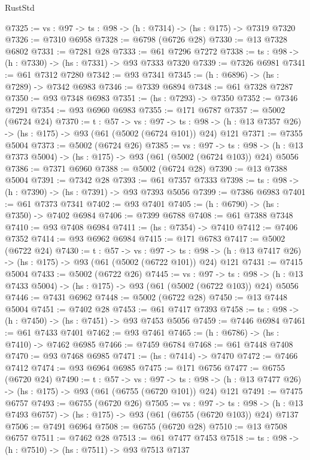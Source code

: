 \begin{lexlean}{RustStd}
\begin{coremodule}
@7325 := {vs : @97} -> {ts : @98} -> (h : @7314) -> (hs : @175) -> @7319 @7320
@7326 := @7310 @6958
@7328 := @6798 (@6726 @28)
@7330 := @13 @7328 @6802
@7331 := @7281 @28
@7333 := @61 @7296 @7272
@7338 := {ts : @98} -> (h : @7330) -> (hs : @7331) -> @93 @7333 @7320
@7339 := @7326 @6981
@7341 := @61 @7312 @7280
@7342 := @93 @7341
@7345 := (h : @6896) -> (hs : @7289) -> @7342 @6983
@7346 := @7339 @6894
@7348 := @61 @7328 @7287
@7350 := @93 @7348 @6983
@7351 := (hs : @7293) -> @7350
@7352 := @7346 @7291
@7354 := @93 @6960 @6983
@7355 := @171 @6787
@7357 := @5002 (@6724 @24)
@7370 := {t : @57} ->
  {vs : @97} ->
  {ts : @98} -> (h : @13 @7357 @26) -> (hs : @175) -> @93 (@61 (@5002 (@6724 @101)) @24) @121
@7371 := @7355 @5004
@7373 := @5002 (@6724 @26)
@7385 := {vs : @97} ->
  {ts : @98} -> (h : @13 @7373 @5004) -> (hs : @175) -> @93 (@61 (@5002 (@6724 @103)) @24) @5056
@7386 := @7371 @6960
@7388 := @5002 (@6724 @28)
@7390 := @13 @7388 @5004
@7391 := @7342 @28
@7393 := @61 @7357 @7333
@7398 := {ts : @98} -> (h : @7390) -> (hs : @7391) -> @93 @7393 @5056
@7399 := @7386 @6983
@7401 := @61 @7373 @7341
@7402 := @93 @7401
@7405 := (h : @6790) -> (hs : @7350) -> @7402 @6984
@7406 := @7399 @6788
@7408 := @61 @7388 @7348
@7410 := @93 @7408 @6984
@7411 := (hs : @7354) -> @7410
@7412 := @7406 @7352
@7414 := @93 @6962 @6984
@7415 := @171 @6783
@7417 := @5002 (@6722 @24)
@7430 := {t : @57} ->
  {vs : @97} ->
  {ts : @98} -> (h : @13 @7417 @26) -> (hs : @175) -> @93 (@61 (@5002 (@6722 @101)) @24) @121
@7431 := @7415 @5004
@7433 := @5002 (@6722 @26)
@7445 := {vs : @97} ->
  {ts : @98} -> (h : @13 @7433 @5004) -> (hs : @175) -> @93 (@61 (@5002 (@6722 @103)) @24) @5056
@7446 := @7431 @6962
@7448 := @5002 (@6722 @28)
@7450 := @13 @7448 @5004
@7451 := @7402 @28
@7453 := @61 @7417 @7393
@7458 := {ts : @98} -> (h : @7450) -> (hs : @7451) -> @93 @7453 @5056
@7459 := @7446 @6984
@7461 := @61 @7433 @7401
@7462 := @93 @7461
@7465 := (h : @6786) -> (hs : @7410) -> @7462 @6985
@7466 := @7459 @6784
@7468 := @61 @7448 @7408
@7470 := @93 @7468 @6985
@7471 := (hs : @7414) -> @7470
@7472 := @7466 @7412
@7474 := @93 @6964 @6985
@7475 := @171 @6756
@7477 := @6755 (@6720 @24)
@7490 := {t : @57} ->
  {vs : @97} ->
  {ts : @98} -> (h : @13 @7477 @26) -> (hs : @175) -> @93 (@61 (@6755 (@6720 @101)) @24) @121
@7491 := @7475 @6757
@7493 := @6755 (@6720 @26)
@7505 := {vs : @97} ->
  {ts : @98} -> (h : @13 @7493 @6757) -> (hs : @175) -> @93 (@61 (@6755 (@6720 @103)) @24) @7137
@7506 := @7491 @6964
@7508 := @6755 (@6720 @28)
@7510 := @13 @7508 @6757
@7511 := @7462 @28
@7513 := @61 @7477 @7453
@7518 := {ts : @98} -> (h : @7510) -> (hs : @7511) -> @93 @7513 @7137

\end{coremodule}
\end{lexlean}
